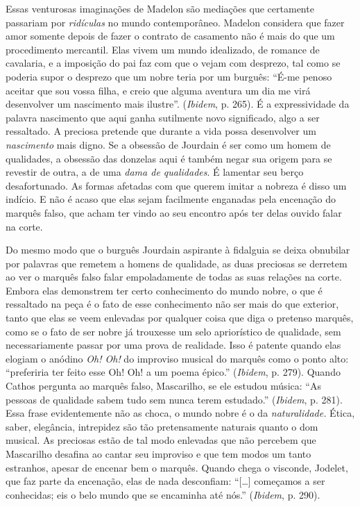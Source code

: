 Essas venturosas imaginações de Madelon são mediações que certamente
passariam por \emph{ridículas} no mundo contemporâneo. Madelon considera
que fazer amor somente depois de fazer o contrato de casamento não é
mais do que um procedimento mercantil. Elas vivem um mundo idealizado,
de romance de cavalaria, e a imposição do pai faz com que o vejam com
desprezo, tal como se poderia supor o desprezo que um nobre teria por um
burguês: ``É-me penoso aceitar que sou vossa filha, e creio que alguma
aventura um dia me virá desenvolver um nascimento mais ilustre''. (\emph{Ibidem},
p. 265). É a expressividade da palavra nascimento que aqui ganha
sutilmente novo significado, algo a ser ressaltado. A preciosa pretende
que durante a vida possa desenvolver um \emph{nascimento} mais digno. Se
a obsessão de Jourdain é ser como um homem de qualidades, a obsessão das
donzelas aqui é também negar sua origem para se revestir de outra, a de
uma \emph{dama de qualidades}. É lamentar seu berço desafortunado. As
formas afetadas com que querem imitar a nobreza é disso um indício. E
não é acaso que elas sejam facilmente enganadas pela encenação do
marquês falso, que acham ter vindo ao seu encontro após ter delas ouvido
falar na corte.

Do mesmo modo que o burguês Jourdain aspirante à fidalguia se deixa
obnubilar por palavras que remetem a homens de qualidade, as duas
preciosas se derretem ao ver o marquês falso falar empoladamente de
todas as suas relações na corte. Embora elas demonstrem ter certo
conhecimento do mundo nobre, o que é ressaltado na peça é o fato de esse
conhecimento não ser mais do que exterior, tanto que elas se veem
enlevadas por qualquer coisa que diga o pretenso marquês, como se o fato
de ser nobre já trouxesse um selo apriorístico de qualidade, sem
necessariamente passar por uma prova de realidade. Isso é patente quando
elas elogiam o anódino \emph{Oh! Oh!} do improviso musical do marquês
como o ponto alto: ``preferiria ter feito esse Oh! Oh! a um poema
épico.'' (\emph{Ibidem}, p. 279). Quando Cathos pergunta ao marquês
falso, Mascarilho, se ele estudou música: ``As pessoas de qualidade
sabem tudo sem nunca terem estudado.'' (\emph{Ibidem}, p. 281). Essa
frase evidentemente não as choca, o mundo nobre é o da
\emph{naturalidade.} Ética, saber, elegância, intrepidez são tão
pretensamente naturais quanto o dom musical. As preciosas estão
de tal modo enlevadas que não percebem que Mascarilho desafina ao cantar
seu improviso e que tem modos um tanto estranhos, apesar de encenar bem
o marquês. Quando chega o visconde, Jodelet, que faz parte da encenação,
elas de nada desconfiam: ``[\ldots{}] começamos a ser conhecidas; eis o
belo mundo que se encaminha até nós.'' (\emph{Ibidem}, p. 290).

